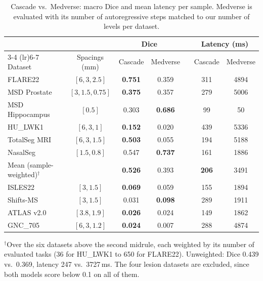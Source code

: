 \begin{table}[t]
  \centering
  \small
  \caption{Cascade vs.\ Medverse: macro Dice and mean latency per sample.
  Medverse is evaluated with its number of autoregressive steps matched to our
  number of levels per dataset.}
  \label{tab:cascade-medverse}
  \begin{tabular}{@{}lcccccc@{}}
    \toprule
    & & \multicolumn{2}{c}{Dice} & & \multicolumn{2}{c}{Latency (ms)} \\
    \cmidrule(lr){3-4} \cmidrule(lr){6-7}
    Dataset & Spacings (mm) & Cascade & Medverse & & Cascade & Medverse \\
    \midrule
    FLARE22         & $[6, 3, 2.5]$    & \textbf{0.751} & 0.359 & & 311 & 4894 \\
    MSD Prostate    & $[3, 1.5, 0.75]$ & \textbf{0.375} & 0.357 & & 279 & 5006 \\
    MSD Hippocampus & $[0.5]$          & 0.303 & \textbf{0.686} & & 99  & 50   \\
    HU\_LWK1        & $[6, 3, 1]$      & \textbf{0.152} & 0.020 & & 439 & 5336 \\
    TotalSeg MRI    & $[6, 3, 1.5]$    & \textbf{0.503} & 0.055 & & 194 & 5188 \\
    NasalSeg        & $[1.5, 0.8]$     & 0.547 & \textbf{0.737} & & 161 & 1886 \\
    \midrule
    Mean (sample-weighted)$^{\dagger}$ & & \textbf{0.526} & 0.393 & & \textbf{206} & 3491 \\
    \midrule
    ISLES22         & $[3, 1.5]$       & \textbf{0.069} & 0.059 & & 155 & 1894 \\
    Shifts-MS       & $[3, 1.5]$       & 0.031 & \textbf{0.098} & & 289 & 1911 \\
    ATLAS v2.0      & $[3.8, 1.9]$     & \textbf{0.026} & 0.024 & & 149 & 1862 \\
    GNC\_705        & $[6, 3, 1.2]$    & \textbf{0.024} & 0.007 & & 288 & 4874 \\
    \bottomrule
  \end{tabular}
  \par\vspace{0.5em}
  \raggedright\footnotesize
  $^{\dagger}$Over the six datasets above the second midrule, each weighted by
  its number of evaluated tasks (36 for HU\_LWK1 to 650 for FLARE22).
  Unweighted: Dice 0.439 vs.\ 0.369, latency 247 vs.\ 3727\,ms. The four
  lesion datasets are excluded, since both models score below 0.1 on all of
  them.
\end{table}


